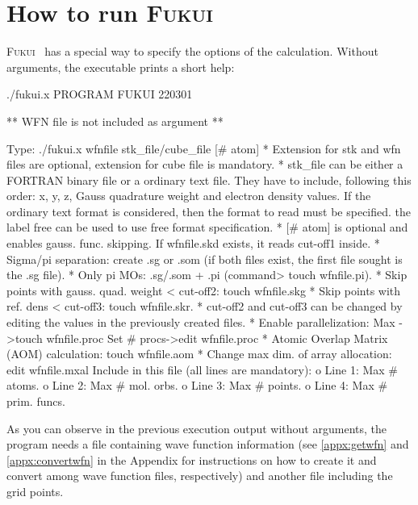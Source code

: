\documentclass[a4paper,11pt,openany]{memoir}
\newcommand\programa{\textsc{Fukui}}
\begin{document}
\begin{enumerate}

\end{enumerate}


\chapter{How to run \programa}
\programa~ has a special way to specify the options of the calculation. Without arguments, the executable prints a short help:
\begin{consola}{./fukui.x}
PROGRAM FUKUI 220301

** WFN file is not included as argument **

Type: ./fukui.x wfnfile stk_file/cube_file [# atom]
* Extension for stk and wfn files are optional, extension for cube file is mandatory.
* stk_file can be either a FORTRAN binary file or a ordinary text file.
They have to include, following this order: x, y, z, Gauss quadrature
weight and electron density values.
If the ordinary text format is considered, then the format to read must
be specified. the label free can be used to use free format specification.
* [# atom] is optional and enables gauss. func. skipping.
If wfnfile.skd exists, it reads cut-off1 inside.
* Sigma/pi separation: create .sg or .som (if both files exist, the first file sought is the .sg file).
* Only pi MOs: .sg/.som + .pi (command> touch wfnfile.pi).
* Skip points with gauss. quad. weight < cut-off2: touch wfnfile.skg
* Skip points with ref. dens < cut-off3: touch wfnfile.skr.
* cut-off2 and cut-off3 can be changed by editing the values in the
previously created files.
* Enable parallelization: Max        ->touch wfnfile.proc
Set # procs->edit  wfnfile.proc
* Atomic Overlap Matrix (AOM) calculation: touch wfnfile.aom
* Change max dim. of array allocation: edit  wfnfile.mxal
Include in this file (all lines are mandatory):
o Line 1: Max # atoms.
o Line 2: Max #    mol. orbs.
o Line 3: Max # points.
o Line 4: Max # prim. funcs.
\end{consola}
As you can observe in the previous execution output without arguments, the program needs a file containing wave function information (see \autoref{appx:getwfn} and \autoref{appx:convertwfn} in the Appendix for instructions on how to create it and convert among wave function files, respectively) and another file including the grid points.
\end{document}
